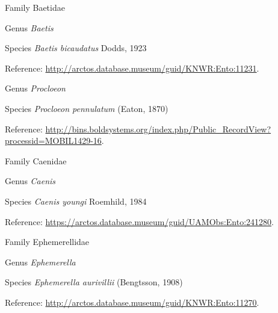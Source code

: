 \documentclass[9pt, article]{memoir}
\begin{document}
\begin{multicols}{2}
\vspace{6pt}\noindent\hspace{24pt}Family Baetidae


\vspace{6pt}\noindent\hspace{30pt}Genus \textit{Baetis}


\vspace{6pt}\noindent\hspace{36pt}Species \textit{Baetis bicaudatus} Dodds, 1923


\vspace{6pt}Reference: 
\url{http://arctos.database.museum/guid/KNWR:Ento:11231}.

\vspace{6pt}\noindent\hspace{30pt}Genus \textit{Procloeon}


\vspace{6pt}\noindent\hspace{36pt}Species \textit{Procloeon pennulatum} (Eaton, 1870)


\vspace{6pt}Reference: 
\url{http://bins.boldsystems.org/index.php/Public_RecordView?processid=MOBIL1429-16}.

\vspace{6pt}\noindent\hspace{24pt}Family Caenidae


\vspace{6pt}\noindent\hspace{30pt}Genus \textit{Caenis}


\vspace{6pt}\noindent\hspace{36pt}Species \textit{Caenis youngi} Roemhild, 1984


\vspace{6pt}Reference: 
\url{https://arctos.database.museum/guid/UAMObs:Ento:241280}.

\vspace{6pt}\noindent\hspace{24pt}Family Ephemerellidae


\vspace{6pt}\noindent\hspace{30pt}Genus \textit{Ephemerella}


\vspace{6pt}\noindent\hspace{36pt}Species \textit{Ephemerella aurivillii} (Bengtsson, 1908)


\vspace{6pt}Reference: 
\url{http://arctos.database.museum/guid/KNWR:Ento:11270}.


\end{multicols}
\end{document}
